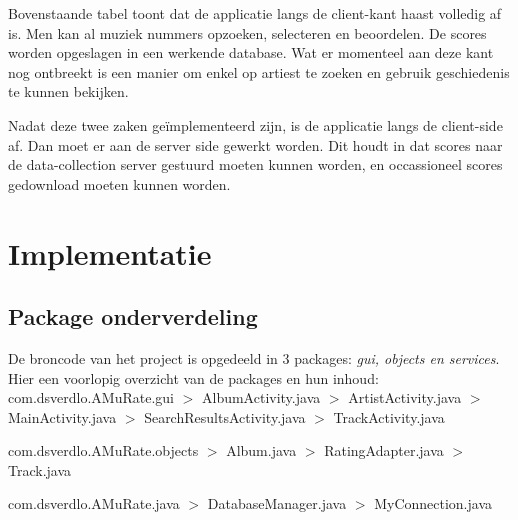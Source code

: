 \documentclass[11pt,a4paper]{article}
\begin{document}
	Bovenstaande tabel toont dat de applicatie langs de client-kant haast volledig af is. Men kan al muziek nummers opzoeken, selecteren en beoordelen. De scores worden opgeslagen in een werkende database. Wat er momenteel aan deze kant nog ontbreekt is een manier om enkel op artiest te zoeken en gebruik geschiedenis te kunnen bekijken. 
	\\ \newline
	
Nadat deze twee zaken geïmplementeerd zijn, is de applicatie langs de client-side af. Dan moet er aan de server side gewerkt worden. Dit houdt in dat scores naar de data-collection server gestuurd moeten kunnen worden, en occassioneel scores gedownload moeten kunnen worden. \\





\section{Implementatie}
	\subsection{Package onderverdeling}
		\normalsize  
		De broncode van het project is opgedeeld in 3 packages: \textit{gui, objects en services}. Hier een voorlopig overzicht van de packages en hun inhoud:\\
		
		 com.dsverdlo.AMuRate.gui \newline		
		 $>$ AlbumActivity.java \newline
		 $>$ ArtistActivity.java \newline
		 $>$ MainActivity.java \newline
		 $>$ SearchResultsActivity.java\newline 
		 $>$ TrackActivity.java \newline
		 
		com.dsverdlo.AMuRate.objects \newline
		$>$ Album.java \newline
		$>$ RatingAdapter.java \newline
		$>$ Track.java \newline
		
		com.dsverdlo.AMuRate.java \newline
		$>$ DatabaseManager.java \newline
		$>$ MyConnection.java \newline
		
\end{document}
